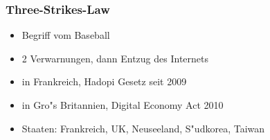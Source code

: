    \begin{frame}
      \frametitle{Three-Strikes-Law}
      \begin{itemize}
        \item Begriff vom Baseball
        \item 2 Verwarnungen, dann Entzug des Internets
        \item in Frankreich, Hadopi Gesetz seit 2009
        \item in Gro"s Britannien, Digital Economy Act 2010
        \item Staaten: Frankreich, UK, Neuseeland, S"udkorea, Taiwan
      \end{itemize}
    \end{frame}
